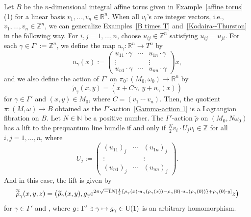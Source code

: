 \documentclass[10pt,a4paper]{amsart}
\numberwithin{equation}{section}
\newcommand{\C}{\mathbb{C}}
\newcommand{\R}{\mathbb{R}}
\newcommand{\Z}{\mathbb{Z}}
\newcommand{\N}{\mathbb{N}}
\renewcommand{\tilde}{\widetilde}
\newcommand{\vardbtilde}[1]{\tilde{\raisebox{0pt}[0.85\height]{$\tilde{#1}$}}}
\begin{document}
\begin{Example}\label{Ex4.8}
Let $B$ be the $n$-dimensional integral affine torus given in Example~\ref{affine torus}\,(1) for a linear basis $v_1,\ldots ,v_n\in \R^n$. When all $v_i$'s are integer vectors, i.e., $v_1,\ldots ,v_n\in \Z^n$, we can generalize Examples~\ref{B times T} and~\ref{Kodaira--Thurston} in the following way. For $i, j=1,\ldots , n$, choose $u_{ij}\in \Z^n$ satisfying $u_{ij}=u_{ji}$.
For each $\gamma \in \Gamma':=\Z^n$, we define the map $u_\gamma\colon \R^n\to T^n$ by
\[
u_\gamma (x):=
\begin{pmatrix}
u_{11}\cdot \gamma & \cdots & u_{1n}\cdot \gamma \\
\vdots & & \vdots \\
u_{n1}\cdot \gamma & \cdots & u_{nn}\cdot \gamma
\end{pmatrix}
x ,
\]
and we also define the action of $\Gamma'$ on $\pi_0\colon (M_0,\omega_0)\to \R^n$ by
\begin{equation}\label{Gamma-action 1}
{\tilde \rho}_\gamma (x,y)=\left(x+C\gamma,\ y+u_\gamma (x)\right)
\end{equation}
for $\gamma\in \Gamma'$ and $(x,y)\in M_0$, where $C=(v_1\ \cdots\ v_n)$. Then, the quotient $\pi\colon (M,\omega)\to B$ obtained as the $\Gamma'$-action~\eqref{Gamma-action 1} is a Lagrangian fibration on $B$.
%
Let $N\in \N$ be a positive number. The $\Gamma'$-action ${\tilde \rho}$ on $(M_0, N\omega_0)$ has a lift to the prequantum line bundle  if and only if $\frac{N}{2}v_i\cdot U_jv_i\in \Z$ for all $i, j=1,\ldots , n$, where
\[
U_j:=
\begin{pmatrix}
(u_{11})_j & \cdots & (u_{1n})_j \\
\vdots & & \vdots \\
(u_{n1})_j & \cdots & (u_{nn})_j
\end{pmatrix}.
\]
And in this case, the lift \smash{${\vardbtilde \rho}$} is given by
\[
{\vardbtilde \rho}_\gamma (x,y,z)=\bigl({\tilde \rho}_\gamma (x,y), g_\gamma {\rm e}^{2\pi\sqrt{-1}N[\frac{1}{2}\{\rho_\gamma (x)\cdot u_\gamma (\rho_\gamma (x))-\rho_\gamma(0)\cdot u_\gamma (\rho_\gamma (0))\}+\rho_\gamma(0)\cdot y]}z\bigr)
\]
for $\gamma\in \Gamma'$ and \smash{$(x,y,z)\in L_0^{\otimes N}\cong \R^n\times T^n\times \C$}, where $g\colon \Gamma' \ni \gamma\mapsto g_\gamma\in {\rm U}(1)$ is an arbitrary homomorphism.
\end{Example}
\end{document}

